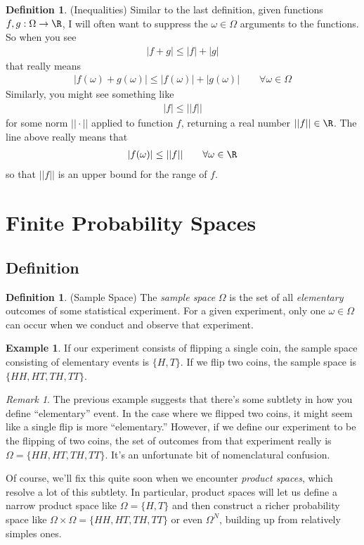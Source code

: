 \documentclass[12pt]{article}
\theoremstyle{plain}
\theoremstyle{definition}
\newtheorem{defn}[thm]{Definition}
\newtheorem{ex}[thm]{Example}
\theoremstyle{remark}
\newtheorem*{rmk}{Remark}
\newcommand{\ra}{\rightarrow}
\begin{document}
\begin{defn}(Inequalities)
Similar to the last definition, given functions
$f,g:\Omega \ra \R$, I will often want to suppress the $\omega\in\Omega$
arguments to the functions. So when you see
\begin{align*}
  |f+g|\leq |f| + |g|
\end{align*}
that really means
\begin{align*}
  |f(\omega)+g(\omega)|\leq |f(\omega)| + |g(\omega)|
  \qquad \forall\omega\in\Omega
\end{align*}
Similarly, you might see something like
\begin{align*}
  |f|\leq ||f||
\end{align*}
for some norm $||\cdot ||$ applied to function $f$, returning a real
number $||f||\in\R$. The line above really means that
\begin{align*}
  |f(\omega)| \leq ||f|| \qquad\forall \omega\in\R
\end{align*}
so that $||f||$ is an upper bound for the range of $f$.
\end{defn}


\clearpage
\section{Finite Probability Spaces}

\subsection{Definition}

\begin{defn}{(Sample Space)}
The \emph{sample space} $\Omega$ is the set of all \emph{elementary}
outcomes of some statistical experiment. For a given experiment, only
one $\omega \in \Omega$ can occur when we conduct and observe that
experiment.
\end{defn}
\begin{ex}
If our experiment consists of flipping a single coin, the sample space
consisting of elementary events is $\{H,T\}$. If we flip two coins, the
sample space is $\{HH,HT,TH,TT\}$.
\end{ex}
\begin{rmk}
The previous example suggests that there's some subtlety in how you
define ``elementary'' event. In the case where we flipped two coins, it
might seem like a single flip is more ``elementary.'' However, if we define
our experiment to be the flipping of two coins, the set of outcomes from
that experiment really is $\Omega=\{HH,HT,TH,TT\}$. It's an unfortunate
bit of nomenclatural confusion.

Of course, we'll fix this quite soon when we encounter \emph{product
spaces}, which resolve a lot of this subtlety. In particular, product
spaces will let us define a narrow product space like $\Omega=\{H,T\}$
and then construct a richer probability space like
$\Omega\times \Omega = \{HH,HT,TH,TT\}$ or even $\Omega^N$, building up
from relatively simples ones.
\end{rmk}
\end{document}
